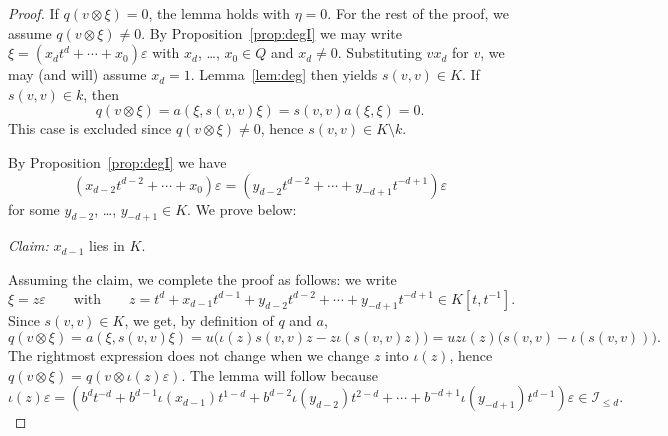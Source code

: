 \documentclass[10pt,a4paper]{amsart}
\newcommand{\calI}{\mathcal{I}}
\begin{document}
\begin{proof}
  If $q(v\otimes\xi)=0$, the lemma holds with $\eta=0$. For the rest
  of the proof, we assume $q(v\otimes\xi)\neq0$.
  By Proposition~\ref{prop:degI} we may write
  $\xi=(x_{d}t^{d}+\cdots+x_0)\varepsilon$ with $x_{d}$,
  \ldots, $x_0\in Q$ and $x_{d}\neq 0$. Substituting $vx_d$ for $v$,
  we may (and will) assume $x_d=1$. Lemma~\ref{lem:deg} then yields
  $s(v,v)\in K$. If $s(v,v)\in k$, then
  \[
    q(v\otimes\xi) = a(\xi,s(v,v)\xi) = s(v,v) a(\xi,\xi)=0.
  \]
  This case is excluded since
  $q(v\otimes\xi)\neq0$, hence $s(v,v)\in K\setminus k$.

  By Proposition~\ref{prop:degI} we
  have
  \[
    (x_{d-2}t^{d-2}+\cdots+x_0)\varepsilon = (y_{d-2}t^{d-2}+\cdots +
    y_{-d+1}t^{-d+1})\varepsilon
  \]
  for some $y_{d-2}$, \ldots, $y_{-d+1}\in K$. We prove below:
  \medbreak

  \noindent\textit{Claim:} $x_{d-1}$ lies in $K$.
  \medbreak

  Assuming the claim, we complete the proof as follows: we write
  \[
    \xi=z\varepsilon \qquad\text{with}\qquad
    z=t^d+x_{d-1}t^{d-1}+y_{d-2}t^{d-2}+\cdots+y_{-d+1}t^{-d+1} \in
    K[t,t^{-1}].
  \]
  Since $s(v,v)\in K$, we get, by definition of $q$ and $a$,
  \begin{equation}
    \label{eq:key}
    q(v\otimes\xi) = a(\xi,s(v,v)\xi) = u\bigl(\iota(z)s(v,v)z -
    z\iota(s(v,v)z)\bigr) =
    uz\iota(z)\bigl(s(v,v)-\iota(s(v,v))\bigr).
  \end{equation}
  The rightmost expression does not change when we change $z$ into
  $\iota(z)$, 
  hence $q(v\otimes\xi) = q(v\otimes\iota(z)\varepsilon)$. 
  The lemma will follow because
  \[
    \iota(z)\varepsilon=(b^dt^{-d}+b^{d-1}\iota(x_{d-1})t^{1-d} +
    b^{d-2}\iota(y_{d-2}) t^{2-d} + \cdots +
    b^{-d+1}\iota(y_{-d+1})t^{d-1})\varepsilon \in \calI_{\leq d}.
  \]
  \medbreak


\end{proof}
\end{document}
